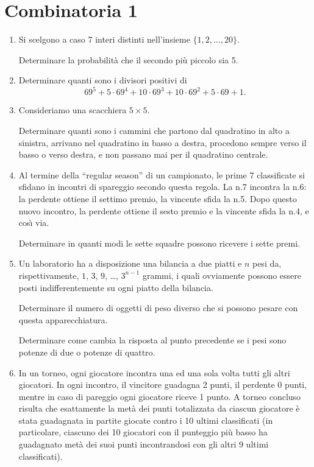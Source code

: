 \documentclass[a4paper,10pt]{article}
\begin{document}
\section{Combinatoria 1}

\begin{enumerate}
	\item  Si scelgono a caso 7 interi distinti nell'insieme $\{1,2,\ldots,20\}$.

	Determinare la probabilit\`{a} che il secondo pi\`{u} piccolo sia 5.

	\item  Determinare quanti sono i divisori positivi di $$69^{5}+5\cdot 69^{4}+10\cdot 69^{3}+10\cdot 69^{2}+5\cdot 69+1.$$

	\item  Consideriamo una scacchiera $5\times 5$.

	Determinare quanti sono i cammini che partono dal quadratino in alto a sinistra, arrivano nel quadratino in basso a destra, procedono 	sempre verso il basso o verso destra, e non passano mai per il quadratino centrale.

	\item  Al termine della ``regular season'' di un campionato, le prime 7 classificate si sfidano in incontri di spareggio secondo questa regola. La n.7 incontra la n.6: la perdente ottiene il settimo premio, la vincente sfida la n.5. Dopo questo nuovo incontro, la perdente ottiene il sesto premio e la vincente sfida la n.4, e cos\`{\i} via.

	Determinare in quanti modi le sette squadre possono ricevere i sette premi.

	\item  Un laboratorio ha a disposizione una bilancia a due piatti e $n$ pesi da, rispettivamente, $1$, $3$, $9$, \ldots, $3^{n-1}$ grammi, i quali ovviamente possono essere posti indifferentemente su ogni piatto della bilancia.

	Determinare il numero di oggetti di peso diverso che si possono pesare con questa apparecchiatura.

	Determinare come cambia la risposta al punto precedente se i pesi sono potenze di due o potenze di quattro.

	\item  In un torneo, ogni giocatore incontra una ed una sola volta tutti gli altri giocatori. In ogni incontro, il vincitore guadagna 2 punti, il perdente 0 punti, mentre in caso di pareggio ogni giocatore riceve 1 punto. A torneo concluso risulta che esattamente la met\`{a} dei punti totalizzata da ciascun giocatore \`{e} stata guadagnata in partite giocate contro i 10 ultimi classificati (in particolare, ciascuno dei 10 giocatori con il punteggio pi\`{u} basso ha guadagnato met\`{a} dei suoi punti incontrandosi con gli altri 9 ultimi classificati).


\end{enumerate}
\end{document}
